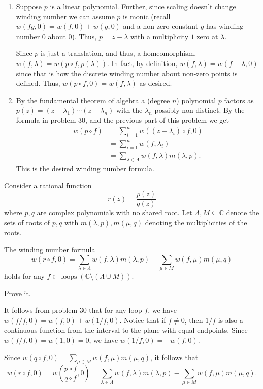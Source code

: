 \documentclass[12 pt, letterpaper]{hmcpset}
\begin{document}
\begin{solution}
	\begin{enumerate}
		\item Suppose $p$ is a linear polynomial. Further, since scaling doesn't change winding number we can assume $p$ is monic (recall  $w(fg, 0) = w(f, 0) + w(g, 0)$ and a non-zero constant $g$ has winding number $0$ about $0$). Thus, $p = z - \lambda$ with a multiplicity $1$ zero at $\lambda$.

			Since $p$ is just a translation, and thus, a homeomorphism, $w(f, \lambda) = w(p \circ f, p(\lambda))$. In fact, by definition, $w(f, \lambda) = w(f - \lambda, 0)$ since that is how the discrete winding number about non-zero points is defined. Thus, $w(p \circ f, 0) = w(f, \lambda)$ as desired.

		\item By the fundamental theorem of algebra a (degree $n$) polynomial $p$ factors as $p(z) = (z - \lambda_{1}) \cdots (z - \lambda_{n})$ with the $\lambda_{n}$ possibly non-distinct. By the formula in problem 30, and the previous part of this problem we get
			\begin{align*}
				w(p \circ f) & = \sum_{i = 1}^{n} w((z - \lambda_{i}) \circ f, 0) \\
					     & = \sum_{i = 1}^{n} w(f, \lambda_{i}) \\
					     & = \sum_{\lambda \in \Lambda} w(f, \lambda) m(\lambda, p).
			\end{align*}
			This is the desired winding number formula.
	\end{enumerate}
\end{solution}

\pagebreak

\begin{problem}[32.]
	Consider a rational function
	\[
		r(z) = \frac{p(z)}{q(z)}
	\]
	where $p, q$ are complex polynomials with no shared root. Let $\Lambda, M \subseteq \mathbb{C}$ denote the sets of roots of $p, q$ with $m(\lambda, p), m(\mu, q)$ denoting the multiplicities of the roots.

	\begin{theorem}
		The winding number formula
		\[
			w(r \circ f, 0) = \sum_{\lambda \in \Lambda} w(f, \lambda) m(\lambda, p) - \sum_{\mu \in M} w(f, \mu) m(\mu, q)
		\]
		holds for any $f \in \operatorname{loops}(\mathbb{C} \setminus (\Lambda \cup M))$.
	\end{theorem}
	
	Prove it.
\end{problem}

\begin{solution}
	It follows from problem 30 that for any loop $f$, we have $w(f / f, 0) = w(f, 0) + w(1 / f, 0)$. Notice that if $f \neq 0$, then $1 / f$ is also a continuous function from the interval to the plane with equal endpoints. Since $w(f / f, 0) = w(1, 0) = 0$, we have $w(1 / f, 0) = - w(f, 0)$.

	Since $w(q \circ f, 0) = \sum_{\mu \in M} w(f, \mu) m(\mu, q)$, it follows that
	\[
		w(r \circ f, 0) = w\left ( \frac{p \circ f}{q \circ f}, 0 \right ) = \sum_{\lambda \in \Lambda} w(f, \lambda) m(\lambda, p) - \sum_{\mu \in M} w(f, \mu) m(\mu, q).
	\]
\end{solution}
\end{document}
